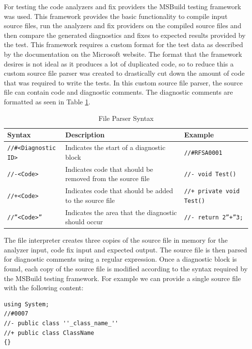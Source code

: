 For testing the code analyzers and fix providers the MSBuild testing framework was used. This framework provides the basic functionality to compile input source files, run the analyzers and fix providers on the compiled source files and then compare the generated diagnostics and fixes to expected results provided by the test.
This framework requires a custom format for the test data as described by the documentation on the Microsoft website. The format that the framework desires is not ideal as it produces a lot of duplicated code, so to reduce this a custom source file parser was created to drastically cut down the amount of code that was required to write the tests. In this custom source file parser, the source file can contain code and diagnostic comments. The diagnostic comments are formatted as seen in Table \ref{tab:FileParserSyntax}.
\begin{table}[H]
    \centering
    \caption{File Parser Syntax}
    \label{tab:FileParserSyntax}
    \begin{tabular}{|p{3.5cm}|p{8cm}|p{4cm}|}
        \hline
        Syntax&Description&Example\\
        \hline
        \texttt{//\#\textless Diagnostic ID\textgreater}&Indicates the start of a diagnostic block&\texttt{//\#RFSA0001}\\
        \texttt{//-\textless Code\textgreater}&Indicates code that should be removed from the source file&\texttt{//- void Test()}\\
        \texttt{//+\textless Code\textgreater}&Indicates code that should be added to the source file&\texttt{//+ private void Test()}\\
        \texttt{//''\textless Code\textgreater''}&Indicates the area that the diagnostic should occur&\texttt{//- return 2''+''3; }\\
        \hline
    \end{tabular}
\end{table}

The file interpreter creates three copies of the source file in memory for the analyzer input, code fix input and expected output. The source file is then parsed for diagnostic comments using a regular expression. Once a diagnostic block is found, each copy of the source file is modified according to the syntax required by the MSBuild testing framework.
For example we can provide a single source file with the following content:
\begin{lstlisting}[style=sharpc]
using System;
//#0007
//- public class ''_class_name_''
//+ public class ClassName
{}
\end{lstlisting}

